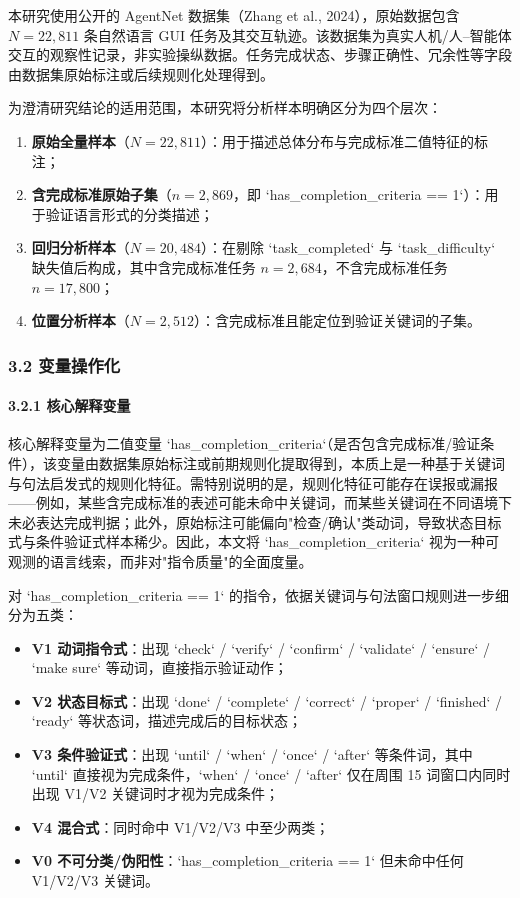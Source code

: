 \documentclass[12pt,a4paper,openany,oneside]{ctexrep}
\begin{document}
本研究使用公开的 AgentNet 数据集（Zhang et al., 2024），原始数据包含 $N=22{,}811$ 条自然语言 GUI 任务及其交互轨迹。该数据集为真实人机/人–智能体交互的观察性记录，非实验操纵数据。任务完成状态、步骤正确性、冗余性等字段由数据集原始标注或后续规则化处理得到。

为澄清研究结论的适用范围，本研究将分析样本明确区分为四个层次：

\begin{enumerate}
\item[1.] \textbf{原始全量样本}（$N=22{,}811$）：用于描述总体分布与完成标准二值特征的标注；
\item[2.] \textbf{含完成标准原始子集}（$n=2{,}869$，即 `has\_completion\_criteria == 1`）：用于验证语言形式的分类描述；
\item[3.] \textbf{回归分析样本}（$N=20{,}484$）：在剔除 `task\_completed` 与 `task\_difficulty` 缺失值后构成，其中含完成标准任务 $n=2{,}684$，不含完成标准任务 $n=17{,}800$；
\item[4.] \textbf{位置分析样本}（$N=2{,}512$）：含完成标准且能定位到验证关键词的子集。
\end{enumerate}


\subsubsection{3.2 变量操作化}


\paragraph{3.2.1 核心解释变量}


核心解释变量为二值变量 `has\_completion\_criteria`（是否包含完成标准/验证条件），该变量由数据集原始标注或前期规则化提取得到，本质上是一种基于关键词与句法启发式的规则化特征。需特别说明的是，规则化特征可能存在误报或漏报——例如，某些含完成标准的表述可能未命中关键词，而某些关键词在不同语境下未必表达完成判据；此外，原始标注可能偏向"检查/确认"类动词，导致状态目标式与条件验证式样本稀少。因此，本文将 `has\_completion\_criteria` 视为一种可观测的语言线索，而非对"指令质量"的全面度量。

对 `has\_completion\_criteria == 1` 的指令，依据关键词与句法窗口规则进一步细分为五类：

\begin{itemize}
\item \textbf{V1 动词指令式}：出现 `check` / `verify` / `confirm` / `validate` / `ensure` / `make sure` 等动词，直接指示验证动作；
\item \textbf{V2 状态目标式}：出现 `done` / `complete` / `correct` / `proper` / `finished` / `ready` 等状态词，描述完成后的目标状态；
\item \textbf{V3 条件验证式}：出现 `until` / `when` / `once` / `after` 等条件词，其中 `until` 直接视为完成条件，`when` / `once` / `after` 仅在周围 15 词窗口内同时出现 V1/V2 关键词时才视为完成条件；
\item \textbf{V4 混合式}：同时命中 V1/V2/V3 中至少两类；
\item \textbf{V0 不可分类/伪阳性}：`has\_completion\_criteria == 1` 但未命中任何 V1/V2/V3 关键词。
\end{itemize}
\end{document}
